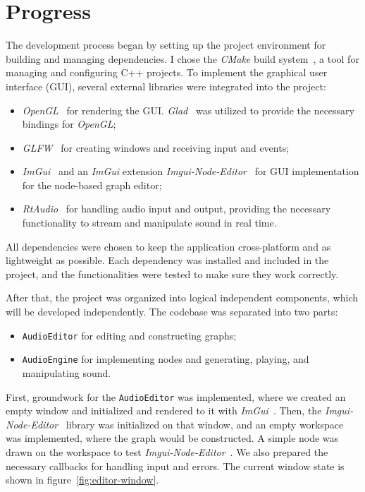 \documentclass[conference]{IEEEtran}
\begin{document}
\section{Progress}
The development process began by setting up the project environment for building and managing dependencies. I chose the \textit{CMake} build system~\cite{cmake}, a tool for managing and configuring C++ projects.
To implement the graphical user interface (GUI), several external libraries were integrated into the project:
\begin{itemize}
    \item \textit{OpenGL}~\cite{opengl} for rendering the GUI. \textit{Glad}~\cite{glad} was utilized to provide the necessary bindings for \textit{OpenGL};
    \item \textit{GLFW}~\cite{glfw} for creating windows and receiving input and events;
    \item \textit{ImGui}~\cite{imgui} and an \textit{ImGui} extension \textit{Imgui-Node-Editor}~\cite{imguinodeeditor} for GUI implementation for the node-based graph editor;
    \item \textit{RtAudio}~\cite{rtaudio} for handling audio input and output, providing the necessary functionality to stream and manipulate sound in real time.
\end{itemize}
All dependencies were chosen to keep the application cross-platform and as lightweight as possible. Each dependency was installed and included in the project, and the functionalities were tested to make sure they work correctly.

After that, the project was organized into logical independent components, which will be developed independently. The codebase was separated into two parts:
\begin{itemize}
    \item \texttt{AudioEditor} for editing and constructing graphs;
    \item \texttt{AudioEngine} for implementing nodes and generating, playing, and manipulating sound.
\end{itemize}
First, groundwork for the \texttt{AudioEditor} was implemented, where we created an empty window and initialized and rendered to it with \textit{ImGui}~\cite{imgui}. Then, the \textit{Imgui-Node-Editor}~\cite{imguinodeeditor} library was initialized on that window, and an empty workspace was implemented, where the graph would be constructed. A simple node was drawn on the workspace to test \textit{Imgui-Node-Editor}~\cite{imguinodeeditor}. We also prepared the necessary callbacks for handling input and errors. The current window state is shown in figure~\ref{fig:editor-window}.
\end{document}

